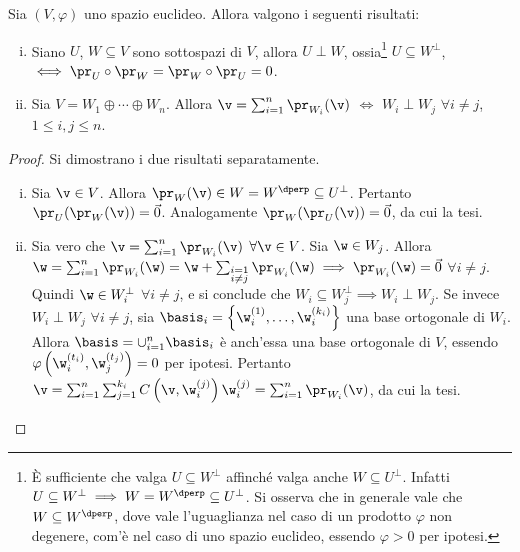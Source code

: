 \documentclass[11pt]{article}
\begin{document}
	\begin{proposition}
		Sia $(V, \varphi)$ uno spazio euclideo. Allora valgono i seguenti risultati:
		
		\begin{enumerate}[(i)]
			\item Siano $U$, $W \subseteq V$ sono sottospazi di $V$, allora $U \perp W$, ossia\footnote{È sufficiente che valga $U \subseteq W^\perp$ affinché valga anche $W \subseteq U^\perp$. Infatti $U \subseteq W^\perp \implies W = W^\dperp \subseteq U^\perp$. Si osserva che in generale vale che $W \subseteq W^\dperp$, dove vale l'uguaglianza nel caso di un prodotto $\varphi$ non degenere, com'è nel caso di uno spazio euclideo,
			essendo $\varphi > 0$ per ipotesi.} $U \subseteq W^\perp$, $\iff \pr_U \circ \pr_W = \pr_W \circ \pr_U = 0$.
			
			\item Sia $V = W_1 \oplus \cdots \oplus W_n$. Allora $\v = \sum_{i=1}^n \pr_{W_i}(\v)$ $\iff$ $W_i \perp W_j$ $\forall i \neq j$, $1 \leq i, j \leq n$.
		\end{enumerate}
	\end{proposition}

	\begin{proof}
		Si dimostrano i due risultati separatamente.
		
		\begin{enumerate}[(i)]
			\item Sia $\v \in V$. Allora $\pr_W(\v) \in W = W^\dperp \subseteq U^\perp$. Pertanto
			$\pr_U(\pr_W(\v)) = \vec 0$. Analogamente $\pr_W(\pr_U(\v)) = \vec 0$, da cui la tesi.
			
			\item Sia vero che $\v = \sum_{i=1}^n \pr_{W_i}(\v)$ $\forall \v \in V$. Sia $\w \in W_j$. Allora $\w = \sum_{i=1}^n \pr_{W_i}(\w) = \w + \sum_{\substack{i=1 \\ i \neq j}} \pr_{W_i}(\w) \implies \pr_{W_i}(\w) = \vec 0$ $\forall i \neq j$. Quindi $\w \in W_i^\perp$ $\forall i \neq j$, e si conclude che $W_i \subseteq W_j^\perp
			\implies W_i \perp W_j$. Se invece $W_i \perp W_j$ $\forall i \neq j$, sia $\basis_i = \left\{ \w_i^{(1)}, \ldots, \w_i^{(k_i)} \right\}$ una base ortogonale di $W_i$. Allora $\basis = \cup_{i=1}^n \basis_i$ è anch'essa
			una base ortogonale di $V$, essendo $\varphi\left(\w_i^{(t_i)}, \w_j^{(t_j)}\right) = 0$ per ipotesi.
			Pertanto $\v = \sum_{i=1}^n \sum_{j=1}^{k_i} C\left(\v, \w_i^{(j)}\right)  \w_i^{(j)} = \sum_{i=1}^n \pr_{W_i}(\v)$,
			da cui la tesi. \qedhere
		\end{enumerate}
	\end{proof}
\end{document}
